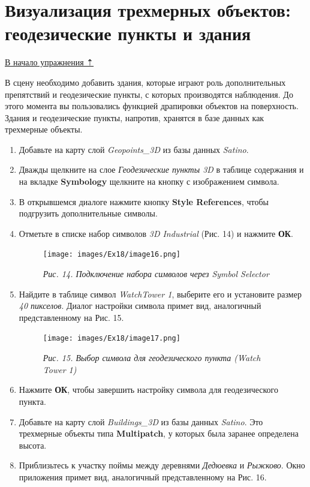 \documentclass[12pt,]{book}
\begin{document}
\hypertarget{threed-modelling-geodesy}{%
\section{Визуализация трехмерных объектов: геодезические пункты и здания}\label{threed-modelling-geodesy}}

\protect\hyperlink{threed-modelling}{В начало упражнения ⇡}

В сцену необходимо добавить здания, которые играют роль дополнительных препятствий и геодезические пункты, с которых производятся наблюдения. До этого момента вы пользовались функцией драпировки объектов на поверхность. Здания и геодезические пункты, напротив, хранятся в базе данных как трехмерные объекты.

\begin{enumerate}
\def\labelenumi{\arabic{enumi}.}
\item
  Добавьте на карту слой \emph{Geopoints\_3D} из базы данных \emph{Satino}.
\item
  Дважды щелкните на слое \emph{Геодезические пункты 3D} в таблице содержания и на вкладке \textbf{Symbology} щелкните на кнопку с изображением символа.
\item
  В открывшемся диалоге нажмите кнопку \textbf{Style References}, чтобы подгрузить дополнительные символы.
\item
  Отметьте в списке набор символов \emph{3D Industrial} (Рис. 14) и нажмите \textbf{ОК}.

  \begin{figure}
  \centering
  \texttt{[image: images/Ex18/image16.png]}
  \caption{\emph{Рис. 14. Подключение набора символов через Symbol Selector}}
  \end{figure}
\item
  Найдите в таблице символ \emph{WatchTower 1}, выберите его и установите размер \emph{40 пикселов}. Диалог настройки символа примет вид, аналогичный представленному на Рис. 15.

  \begin{figure}
  \centering
  \texttt{[image: images/Ex18/image17.png]}
  \caption{\emph{Рис. 15. Выбор символа для геодезического пункта (Watch Tower 1)}}
  \end{figure}
\item
  Нажмите \textbf{ОК}, чтобы завершить настройку символа для геодезического пункта.
\item
  Добавьте на карту слой \emph{Buildings\_3D} из базы данных \emph{Satino}. Это трехмерные объекты типа \textbf{Multipatch}, у которых была заранее определена высота.
\item
  Приблизьтесь к участку поймы между деревнями \emph{Дедюевка} и \emph{Рыжково}. Окно приложения примет вид, аналогичный представленному на Рис. 16.


\end{enumerate}
\end{document}
